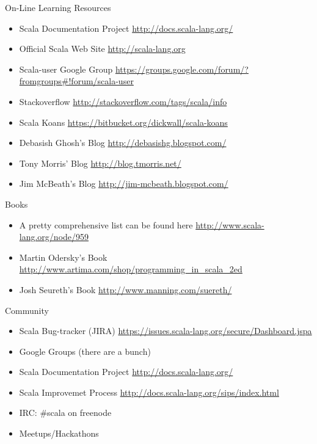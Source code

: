 \documentclass[14pt,t,usepdftitle=false,xcolornames=x11names,svgnames,dvipsnames,usenames]{beamer}
\newcommand{\tinyurl}[1]{
  {\tiny{\textcolor{keyword}{\url{#1}}}}}
\begin{document}
\begin{frame}{On-Line Learning Resources}
  \begin{itemize}[<+->]
    \item Scala Documentation Project \tinyurl{http://docs.scala-lang.org/}
    \item Official Scala Web Site \tinyurl{http://scala-lang.org}
    \item Scala-user Google Group \tinyurl{https://groups.google.com/forum/?fromgroups\#!forum/scala-user}
    \item Stackoverflow \tinyurl{http://stackoverflow.com/tags/scala/info}
    \item Scala Koans \tinyurl{https://bitbucket.org/dickwall/scala-koans}
    \item Debasish Ghosh's Blog \tinyurl{http://debasishg.blogspot.com/}
    \item Tony Morris' Blog \tinyurl{http://blog.tmorris.net/}
    \item Jim McBeath's Blog \tinyurl{http://jim-mcbeath.blogspot.com/}
  \end{itemize}
\end{frame}

\begin{frame}{Books}
  \begin{itemize}[<+->]
    \item A pretty comprehensive list can be found here \tinyurl{http://www.scala-lang.org/node/959}
    \item Martin Odersky's Book \tinyurl{http://www.artima.com/shop/programming_in_scala_2ed}
    \item Josh Seureth's Book \tinyurl{http://www.manning.com/suereth/}
  \end{itemize}
\end{frame}

\begin{frame}{Community}
  \begin{itemize}[<+->]
    \item Scala Bug-tracker (JIRA) \tinyurl{https://issues.scala-lang.org/secure/Dashboard.jspa}
    \item Google Groups (there are a bunch)
    \item Scala Documentation Project \tinyurl{http://docs.scala-lang.org/}
    \item Scala Improvemet Process \tinyurl{http://docs.scala-lang.org/sips/index.html}
    \item IRC: \#scala on freenode
    \item Meetups/Hackathons
  \end{itemize}
\end{frame}
\end{document}
